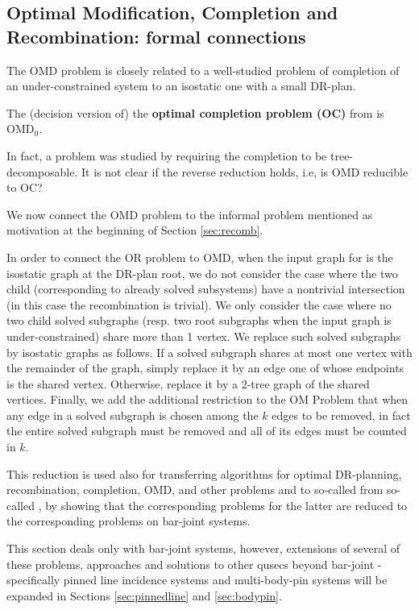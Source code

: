 \subsection{Optimal Modification, Completion and Recombination: formal
connections}
%
The OMD problem is closely related to a well-studied problem of
completion of an under-constrained system to an isostatic one with a
small DR-plan.
\begin{observation}
    The (decision version of) the {\bf optimal completion problem
    (OC)} from \cite{bib:survey, j-a, fang} is OMD$_0$.
\end{observation}
In fact, a  problem was studied by \cite{j-a}
requiring the completion to be tree-decomposable. It is not clear if
the reverse reduction holds, i.e, is OMD reducible to OC?

We now connect the OMD problem to the informal  problem mentioned as motivation at the beginning
of Section \ref{sec:recomb}.

In order to connect the OR problem to OMD, when the input graph for is
the isostatic graph at the DR-plan root, we do not consider the case
where the two child  (corresponding to already
solved subsystems) have a nontrivial intersection (in this case the
recombination is trivial). We only consider the case where no two
child solved subgraphs (resp. two root subgraphs when the input graph
is under-constrained) share more than 1 vertex. We replace such solved
subgraphs  by isostatic graphs as follows. If a solved subgraph shares
at most one vertex with the remainder of the graph, simply replace it
by an edge one of whose endpoints  is the shared vertex. Otherwise,
replace it by  a 2-tree graph of the shared vertices. Finally, we add
the additional restriction to the OM Problem that when any edge in a
solved subgraph is chosen among the $k$ edges to be removed, in fact
the entire solved subgraph must be removed  and all of its edges must
be counted in $k$.

This reduction is used also for transferring  algorithms for optimal
DR-planning, recombination, completion, OMD, and other problems and to
so-called  from so-called ,
by showing that the corresponding problems for the latter are reduced
to the corresponding problems on bar-joint systems.

\note This section deals only with bar-joint systems, however,
extensions of several of these problems, approaches and solutions to
other qusecs beyond  bar-joint - specifically pinned line incidence
systems and multi-body-pin systems will be expanded in Sections
\ref{sec:pinnedline} and \ref{sec:bodypin}.
